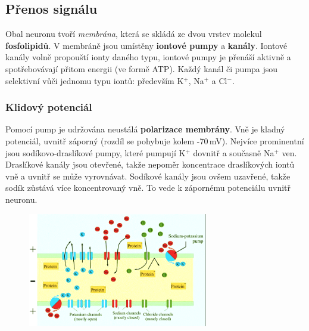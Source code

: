 \documentclass[11pt]{report} %
\begin{document}
\subsection{Přenos signálu}
Obal neuronu tvoří \textit{membrána}, která se skládá ze dvou vrstev molekul \textbf{fosfolipidů}. V membráně jsou umístěny \textbf{iontové pumpy} a \textbf{kanály}. Iontové kanály volně propouští ionty daného typu, iontové pumpy je přenáší aktivně a spotřebovávají přitom energii (ve formě ATP). Každý kanál či pumpa jsou selektivní vůči jednomu typu iontů: především K$^+$, Na$^+$ a Cl$^-$.

\subsubsection{Klidový potenciál}
Pomocí pump je udržována neustálá \textbf{polarizace membrány}. Vně je kladný potenciál, uvnitř záporný (rozdíl se pohybuje kolem -70\,mV). Nejvíce prominentní jsou sodíkovo-draslíkové pumpy, které pumpují K$^+$ dovnitř a současně Na$^+$ ven. Draslíkové kanály jsou otevřené, takže nepoměr koncentrace draslíkových iontů vně a uvnitř se může vyrovnávat. Sodíkové kanály jsou ovšem uzavřené, takže sodík zůstává více koncentrovaný vně. To vede k zápornému potenciálu uvnitř neuronu.

\begin{figure}[H]
	\centering
	\includegraphics[width=0.7\textwidth]{img/resting_potential.png}
\end{figure}
\end{document}
